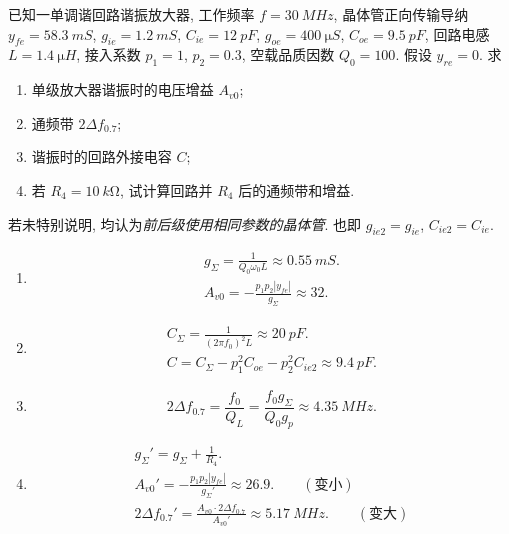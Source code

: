 \begin{exampleprob}
    已知一单调谐回路谐振放大器, 工作频率 $f=\qty{30}{MHz}$, 晶体管正向传输导纳 $y_{fe}=\qty{58.3}{mS}$, $g_{ie}=\qty{1.2}{mS}$, $C_{ie}=\qty{12}{pF}$, $g_{oe}=\qty{400}{\micro S}$, $C_{oe}=\qty{9.5}{pF}$, 回路电感 $L=\qty{1.4}{\micro H}$, 接入系数 $p_1=1$, $p_2=0.3$, 空载品质因数 $Q_0=100$. 假设 $y_{re}=0$. 求
    \begin{enumerate}[label=(\arabic*)]
        \item 单级放大器谐振时的电压增益 $A_{v0}$;
        \item 通频带 $2\Delta f_{0.7}$;
        \item 谐振时的回路外接电容 $C$;
        \item 若 $R_4=\qty{10}{k\ohm}$, 试计算回路并 $R_4$ 后的通频带和增益.
    \end{enumerate}

    \begin{solution}
        若未特别说明, 均认为\textit{前后级使用相同参数的晶体管}. 也即 $g_{ie2}=g_{ie}$, $C_{ie2}=C_{ie}$.

        \begin{enumerate}[label=(\arabic*)]
            \item \begin{gather*}
                      g_\Sigma=\frac{1}{Q_0\omega_0L} \approx \qty{0.55}{mS}. \\
                      A_{v0}=-\frac{p_1p_2|y_{fe}|}{g_\Sigma}\approx 32.
                  \end{gather*}
            \item \begin{gather*}
                      C_\Sigma=\frac{1}{(2\pi f_0)^2L}\approx\qty{20}{pF}. \\
                      C=C_\Sigma-p_1^2C_{oe}-p_2^2C_{ie2}\approx\qty{9.4}{pF}.
                  \end{gather*}
            \item \begin{equation*}
                      2\Delta f_{0.7}=\frac{f_0}{Q_L}=\frac{f_0g_\Sigma}{Q_0g_p}\approx\qty{4.35}{MHz}.
                  \end{equation*}
            \item \begin{gather*}
                      g_\Sigma'=g_\Sigma+\frac{1}{R_4}. \\
                      A_{v0}'=-\frac{p_1p_2|y_{fe}|}{g_\Sigma'}\approx 26.9. \qquad (\textrm{变小}) \\
                      2\Delta f_{0.7}'=\frac{A_{v0}\cdot 2\Delta f_{0.7}}{A_{v0}'}\approx\qty{5.17}{MHz}. \qquad (\textrm{变大})
                  \end{gather*}
        \end{enumerate}
    \end{solution}
\end{exampleprob}
